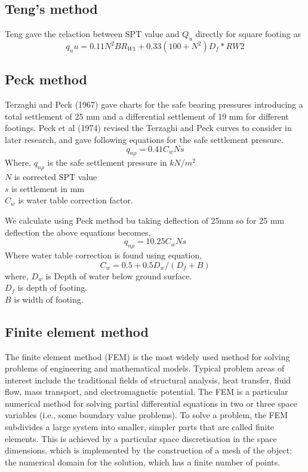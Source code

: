\subsection{Teng's method}
Teng gave the relaction between SPT value and $Q_u$ directly for square footing as
\begin{equation}
q_nu = 0.11 N^2 B R_{W1} + 0.33 (100+N^2)D_f*R{W2}
\end{equation}


\subsection{Peck method}
Terzaghi and Peck (1967) gave charts for the safe bearing pressures introducing a total settlement of 25 mm and a differential settlement of 19 mm for different footings. Peck et al (1974) revised the Terzaghi and Peck curves to consider in later research, and gave following equations for the safe settlement pressure.
\begin{equation}
q_{n\rho} = 0.41 C_w Ns
\end{equation}
Where,
 $q_{n\rho}$ is the safe settlement pressure in $kN/m^2$\\
 $N$ is corrected SPT value\\
 $s$ is settlement in mm\\
 $C_w$ is water table correction factor.
 
We calculate using Peck method bu taking deflection of 25mm so for 25 mm deflection the above equations becomes,
\begin{equation}
q_{n\rho} = 10.25 C_w Ns
\end{equation}
Where water table correction is found using equation,
\begin{equation}
C_w=0.5+0.5 D_w / (D_f + B)
\end{equation}
where,
$D_w$ is Depth of water below ground surface.\\
$D_f$  is depth of footing.\\
$B$ is width of footing.

\subsection{Finite element method}
The finite element method (FEM) is the most widely used method for solving problems of engineering and mathematical models. Typical problem areas of interest include the traditional fields of structural analysis, heat transfer, fluid flow, mass transport, and electromagnetic potential. The FEM is a particular numerical method for solving partial differential equations in two or three space variables (i.e., some boundary value problems). To solve a problem, the FEM subdivides a large system into smaller, simpler parts that are called finite elements. This is achieved by a particular space discretisation in the space dimensions, which is implemented by the construction of a mesh of the object: the numerical domain for the solution, which has a finite number of points. 
